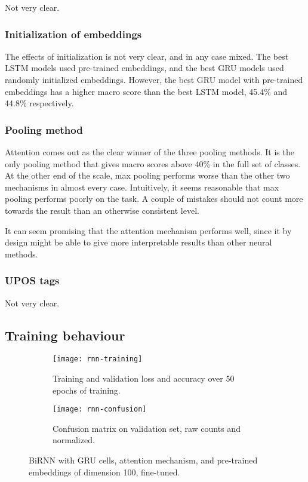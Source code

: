 Not very clear.


\subsubsection*{Initialization of embeddings}

The effects of initialization is not very clear, and in any case mixed.
The best LSTM models used pre-trained embeddings, and the best GRU models
used randomly initialized embeddings. However, the best GRU model with
pre-trained embeddings has a higher macro \FI score than the best LSTM model,
45.4\% and 44.8\% respectively.


\subsubsection*{Pooling method}

Attention comes out as the clear winner of the three pooling methods. It is
the only pooling method that gives macro \FI scores above 40\% in the full
set of classes. At the other end of the scale, max pooling performs worse
than the other two mechanisms in almost every case. Intuitively, it seems
reasonable that max pooling performs poorly on the task. A couple of mistakes
should not count more towards the result than an otherwise consistent level.

It can seem promising that the attention mechanism performs well, since it
by design might be able to give more interpretable results than other neural
methods.


\subsubsection*{UPOS tags}

Not very clear.


\subsection{Training behaviour}

\begin{figure}
  \begin{subfigure}{\linewidth}
    \centering
    \texttt{[image: rnn-training]}
    \caption{Training and validation loss and accuracy over 50 epochs of training.}
  \end{subfigure}
  \begin{subfigure}{\linewidth}
    \centering
    \texttt{[image: rnn-confusion]}
    \caption{Confusion matrix on validation set, raw counts and normalized.}
  \end{subfigure}
  \caption[Training behaviour of BiGRU with attention]{
    BiRNN with GRU cells, attention mechanism, and pre-trained
    embeddings of dimension 100, fine-tuned.
  }
  \label{fig:rnn-training}
\end{figure}

